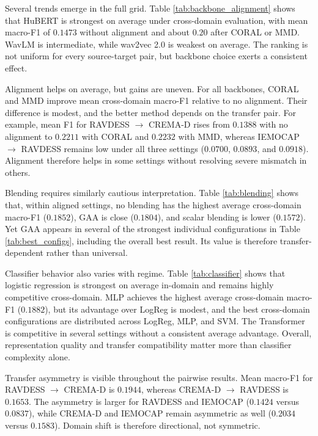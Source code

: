 \documentclass[9pt,twocolumn,letterpaper]{article}
\begin{document}
Several trends emerge in the full grid. Table \ref{tab:backbone_alignment} shows that HuBERT is strongest on average under cross-domain evaluation, with mean macro-F1 of $0.1473$ without alignment and about $0.20$ after CORAL or MMD. WavLM is intermediate, while wav2vec 2.0 is weakest on average. The ranking is not uniform for every source-target pair, but backbone choice exerts a consistent effect.

Alignment helps on average, but gains are uneven. For all backbones, CORAL and MMD improve mean cross-domain macro-F1 relative to no alignment. Their difference is modest, and the better method depends on the transfer pair. For example, mean F1 for RAVDESS $\rightarrow$ CREMA-D rises from $0.1388$ with no alignment to $0.2211$ with CORAL and $0.2232$ with MMD, whereas IEMOCAP $\rightarrow$ RAVDESS remains low under all three settings ($0.0700$, $0.0893$, and $0.0918$). Alignment therefore helps in some settings without resolving severe mismatch in others.

Blending requires similarly cautious interpretation. Table \ref{tab:blending} shows that, within aligned settings, no blending has the highest average cross-domain macro-F1 ($0.1852$), GAA is close ($0.1804$), and scalar blending is lower ($0.1572$). Yet GAA appears in several of the strongest individual configurations in Table \ref{tab:best_configs}, including the overall best result. Its value is therefore transfer-dependent rather than universal.

Classifier behavior also varies with regime. Table \ref{tab:classifier} shows that logistic regression is strongest on average in-domain and remains highly competitive cross-domain. MLP achieves the highest average cross-domain macro-F1 ($0.1882$), but its advantage over LogReg is modest, and the best cross-domain configurations are distributed across LogReg, MLP, and SVM. The Transformer is competitive in several settings without a consistent average advantage. Overall, representation quality and transfer compatibility matter more than classifier complexity alone.

Transfer asymmetry is visible throughout the pairwise results. Mean macro-F1 for RAVDESS $\rightarrow$ CREMA-D is $0.1944$, whereas CREMA-D $\rightarrow$ RAVDESS is $0.1653$. The asymmetry is larger for RAVDESS and IEMOCAP ($0.1424$ versus $0.0837$), while CREMA-D and IEMOCAP remain asymmetric as well ($0.2034$ versus $0.1583$). Domain shift is therefore directional, not symmetric.
\end{document}
